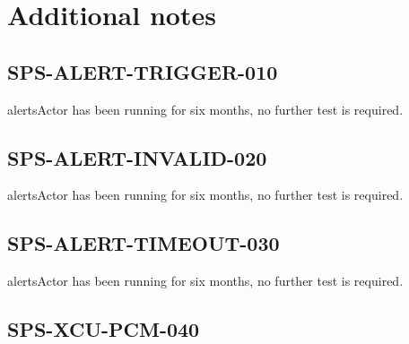 \section{Additional notes}

\subsection{SPS-ALERT-TRIGGER-010}
\label{sec:tc-010}
alertsActor has been running for six months, no further test is required.

\subsection{SPS-ALERT-INVALID-020}
\label{sec:tc-020}

alertsActor has been running for six months, no further test is required.

\subsection{SPS-ALERT-TIMEOUT-030}
\label{sec:tc-030}

alertsActor has been running for six months, no further test is required.

\subsection{SPS-XCU-PCM-040}
\label{sec:tc-040}


